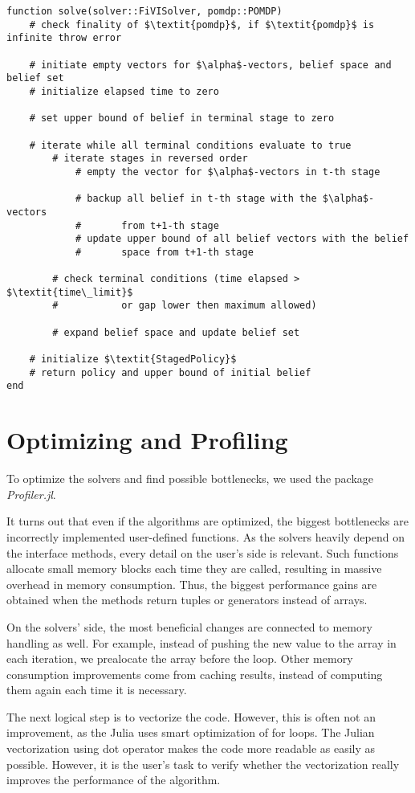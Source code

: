 \begin{samepage}
\begin{verbatim}
function solve(solver::FiVISolver, pomdp::POMDP)
    # check finality of $\textit{pomdp}$, if $\textit{pomdp}$ is infinite throw error

    # initiate empty vectors for $\alpha$-vectors, belief space and belief set
    # initialize elapsed time to zero
    
    # set upper bound of belief in terminal stage to zero
    
    # iterate while all terminal conditions evaluate to true
        # iterate stages in reversed order
            # empty the vector for $\alpha$-vectors in t-th stage

            # backup all belief in t-th stage with the $\alpha$-vectors 
            #       from t+1-th stage
            # update upper bound of all belief vectors with the belief 
            #       space from t+1-th stage
            
        # check terminal conditions (time elapsed > $\textit{time\_limit}$ 
        #           or gap lower then maximum allowed)
        
        # expand belief space and update belief set
        
    # initialize $\textit{StagedPolicy}$
    # return policy and upper bound of initial belief
end
\end{verbatim}
\end{samepage}





\section{Optimizing and Profiling}

To optimize the solvers and find possible bottlenecks, we used the package \textit{Profiler.jl}. 

It turns out that even if the algorithms are optimized, the biggest bottlenecks are incorrectly implemented user-defined functions. As the solvers heavily depend on the interface methods, every detail on the user's side is relevant. Such functions allocate small memory blocks each time they are called, resulting in massive overhead in memory consumption. Thus, the biggest performance gains are obtained when the methods return tuples or generators instead of arrays. 

On the solvers' side, the most beneficial changes are connected to memory handling as well. For example, instead of pushing the new value to the array in each iteration, we prealocate the array before the loop. Other memory consumption improvements come from caching results, instead of computing them again each time it is necessary.

The next logical step is to vectorize the code. However, this is often not an improvement, as the Julia uses smart optimization of for loops. The Julian vectorization using dot operator makes the code more readable as easily as possible. However, it is the user's task to verify whether the vectorization really improves the performance of the algorithm.
